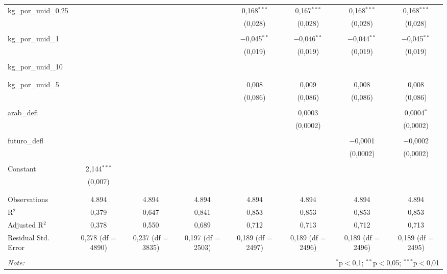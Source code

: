\begin{table}[!htbp]
\begin{tabular}{@{\extracolsep{5pt}}lccccccc}
 kg\_por\_unid\_0.25 &  &  &  & 0,168$^{***}$ & 0,167$^{***}$ & 0,168$^{***}$ & 0,168$^{***}$ \\ 
  &  &  &  & (0,028) & (0,028) & (0,028) & (0,028) \\ 
  & & & & & & & \\ 
 kg\_por\_unid\_1 &  &  &  & $-$0,045$^{**}$ & $-$0,046$^{**}$ & $-$0,044$^{**}$ & $-$0,045$^{**}$ \\ 
  &  &  &  & (0,019) & (0,019) & (0,019) & (0,019) \\ 
  & & & & & & & \\ 
 kg\_por\_unid\_10 &  &  &  &  &  &  &  \\ 
  &  &  &  &  &  &  &  \\ 
  & & & & & & & \\ 
 kg\_por\_unid\_5 &  &  &  & 0,008 & 0,009 & 0,008 & 0,008 \\ 
  &  &  &  & (0,086) & (0,086) & (0,086) & (0,086) \\ 
  & & & & & & & \\ 
 arab\_defl &  &  &  &  & 0,0003 &  & 0,0004$^{*}$ \\ 
  &  &  &  &  & (0,0002) &  & (0,0002) \\ 
  & & & & & & & \\ 
 futuro\_defl &  &  &  &  &  & $-$0,0001 & $-$0,0002 \\ 
  &  &  &  &  &  & (0,0002) & (0,0002) \\ 
  & & & & & & & \\ 
 Constant & 2,144$^{***}$ &  &  &  &  &  &  \\ 
  & (0,007) &  &  &  &  &  &  \\ 
  & & & & & & & \\ 
\hline \\[-1.8ex] 
Observations & 4.894 & 4.894 & 4.894 & 4.894 & 4.894 & 4.894 & 4.894 \\ 
R$^{2}$ & 0,379 & 0,647 & 0,841 & 0,853 & 0,853 & 0,853 & 0,853 \\ 
Adjusted R$^{2}$ & 0,378 & 0,550 & 0,689 & 0,712 & 0,713 & 0,712 & 0,713 \\ 
Residual Std. Error & 0,278 (df = 4890) & 0,237 (df = 3835) & 0,197 (df = 2503) & 0,189 (df = 2497) & 0,189 (df = 2496) & 0,189 (df = 2496) & 0,189 (df = 2495) \\ 
\hline 
\hline \\[-1.8ex] 
\textit{Note:}  & \multicolumn{7}{r}{$^{*}$p$<$0,1; $^{**}$p$<$0,05; $^{***}$p$<$0,01} \\ 
\end{tabular} 
\end{table} 
